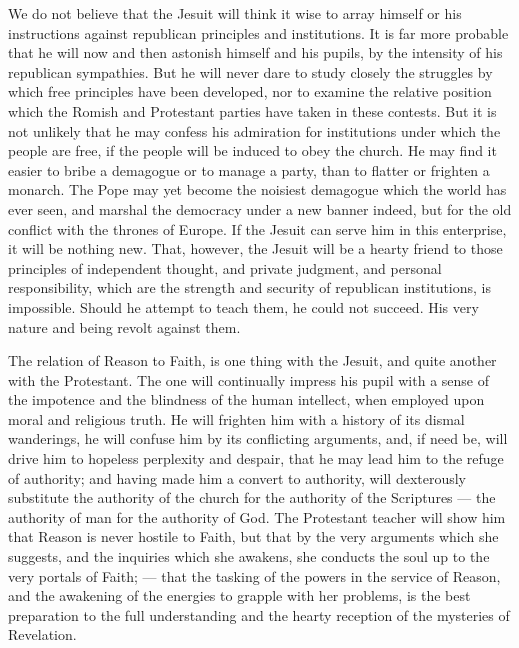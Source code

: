 \documentclass[]{book}
\begin{document}
We do not believe that the Jesuit will think it wise to array himself or his instructions against republican principles and institutions. It is far more probable that he will now and then astonish himself and his pupils, by the intensity of his republican sympathies. But he will never dare to study closely the struggles by which free principles have been developed, nor to examine the relative position which the Romish and Protestant parties have taken in these contests. But it is not unlikely that he may confess his admiration for institutions under which the people are free, if the people will be induced to obey the church. He may find it easier to bribe a demagogue or to manage a party, than to flatter or frighten a monarch. The Pope may yet become the noisiest demagogue which the world has ever seen, and marshal the democracy under a new banner indeed, but for the old conflict with the thrones of Europe. If the Jesuit can serve him in this enterprise, it will be nothing new. That, however, the Jesuit will be a hearty friend to those principles of independent thought, and private judgment, and personal responsibility, which are the strength and security of republican institutions, is impossible. Should he attempt to teach them, he could not succeed. His very nature and being revolt against them.

The relation of Reason to Faith, is one thing with the Jesuit, and quite another with the Protestant. The one will continually impress his pupil with a sense of the impotence and the blindness of the human intellect, when employed upon moral and religious truth. He will frighten him with a history of its dismal wanderings, he will confuse him by its conflicting arguments, and, if need be, will drive him to hopeless perplexity and despair, that he may lead him to the refuge of authority; and having made him a convert to authority, will dexterously substitute the authority of the church for the authority of the Scriptures --- the authority of man for the authority of God. The Protestant teacher will show him that Reason is never hostile to Faith, but that by the very arguments which she suggests, and the inquiries which she awakens, she conducts the soul up to the very portals of Faith; --- that the tasking of the powers in the service of Reason, and the awakening of the energies to grapple with her problems, is the best preparation to the full understanding and the hearty reception of the mysteries of Revelation.
\end{document}
